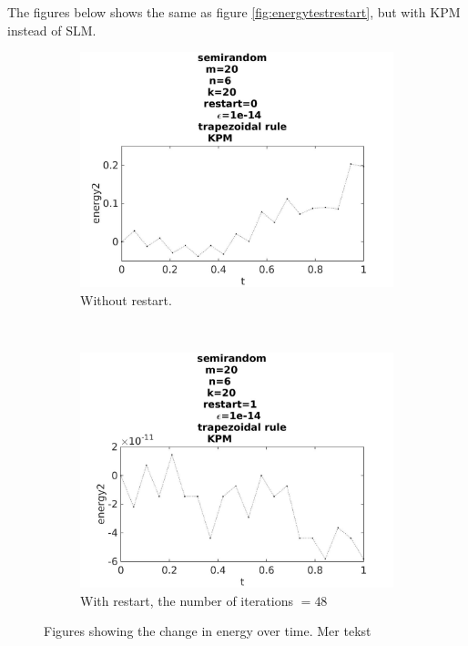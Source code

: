 The figures below shows the same as figure \ref{fig:energytestrestart}, but with KPM instead of SLM. 

\begin{figure}[H]
        \centering
        \begin{subfigure}[b]{0.45\textwidth}
                \includegraphics[width=\textwidth]{../MATLAB/fig/energyarnrestart0.jpg}
                \caption{  Without restart. }
                \label{fig:energyarnrestart0}
        \end{subfigure}%
        ~
        \begin{subfigure}[b]{0.45\textwidth}
                \includegraphics[width=\textwidth]{../MATLAB/fig/energyarnrestart1.jpg}
                \caption{ With restart, the number of iterations $ = 48$ }
                \label{fig:energyarnrestart1}
        \end{subfigure}
        \caption{ Figures showing the change in energy over time. Mer tekst  }
        \label{fig:energyarnrestart}
\end{figure}

